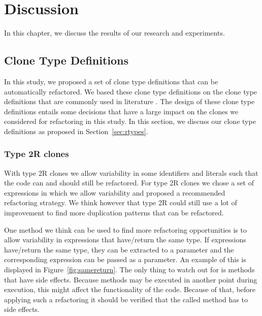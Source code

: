 \chapter{Discussion} \label{ch:discussion}

In this chapter, we discuss the results of our research and experiments.

\section{Clone Type Definitions}
In this study, we proposed a set of clone type definitions that can be automatically refactored. We based these clone type definitions on the clone type definitions that are commonly used in literature \cite{roy2007survey}. The design of these clone type definitions entails some decisions that have a large impact on the clones we considered for refactoring in this study. In this section, we discuss our clone type definitions as proposed in Section~\ref{sec:rtypes}.

\subsection{Type 2R clones}
With type 2R clones we allow variability in some identifiers and literals such that the code can and should still be refactored. For type 2R clones we chose a set of expressions in which we allow variability and proposed a recommended refactoring strategy. We think however that type 2R could still use a lot of improvement to find more duplication patterns that can be refactored.

One method we think can be used to find more refactoring opportunities is to allow variability in expressions that have/return the same type. If expressions have/return the same type, they can be extracted to a parameter and the corresponding expression can be passed as a parameter. An example of this is displayed in Figure~\ref{fig:samereturn}. The only thing to watch out for is methods that have side effects. Because methods may be executed in another point during execution, this might affect the functionality of the code. Because of that, before applying such a refactoring it should be verified that the called method has to side effects.

